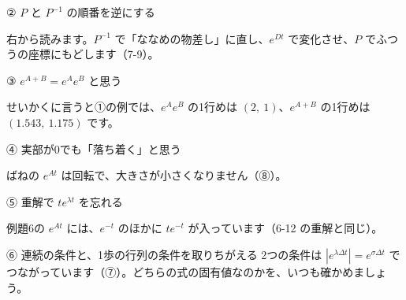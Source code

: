 \begingroup{}%
\noindent\begin{minipage}[t]{0.485\linewidth}\vspace{0pt}
\begin{tsumazuki}{② $P$ と $P^{-1}$ の順番を逆にする}
\raggedright{}
右から読みます。$P^{-1}$ で「ななめの物差し」に直し、$e^{Dt}$ で変化させ、$P$ でふつうの座標にもどします（7-9）。
\end{tsumazuki}
\end{minipage}\hfill
\begin{minipage}[t]{0.485\linewidth}\vspace{0pt}
\begin{tsumazuki}{③ $e^{A+B}=e^Ae^B$ と思う}
\raggedright{}
せいかくに言うと①の例では、$e^Ae^B$ の1行めは $(2,\ 1)$、$e^{A+B}$ の1行めは $(1.543,\ 1.175)$ です。
\end{tsumazuki}
\end{minipage}\par
\endgroup

\begingroup{}%
\noindent\begin{minipage}[t]{0.485\linewidth}\vspace{0pt}
\begin{tsumazuki}{④ 実部が0でも「落ち着く」と思う}
\raggedright{}
ばねの $e^{At}$ は回転で、大きさが小さくなりません（⑧）。
\end{tsumazuki}
\end{minipage}\hfill
\begin{minipage}[t]{0.485\linewidth}\vspace{0pt}
\begin{tsumazuki}{⑤ 重解で $te^{\lambda t}$ を忘れる}
\raggedright{}
例題6の $e^{At}$ には、$e^{-t}$ のほかに $te^{-t}$ が入っています（6-12 の重解と同じ）。
\end{tsumazuki}
\end{minipage}\par
\endgroup

\begin{tsumazuki}{⑥ 連続の条件と、1歩の行列の条件を取りちがえる}
2つの条件は $|e^{\lambda\Delta t}|=e^{\sigma\Delta t}$ でつながっています（⑦）。どちらの式の固有値なのかを、いつも確かめましょう。
\end{tsumazuki}

